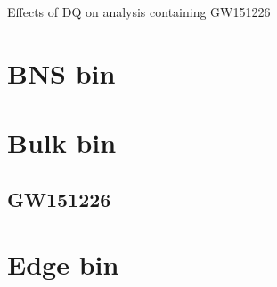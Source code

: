 Effects of DQ on analysis containing GW151226

\section{BNS bin}

\section{Bulk bin}

\subsection{GW151226}

\section{Edge bin}



